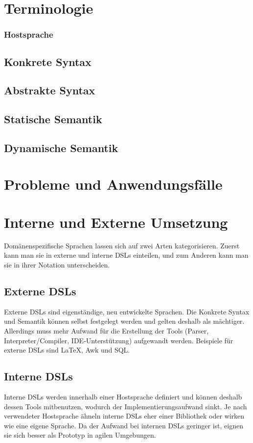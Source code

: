 \documentclass[../InterneDSLs.tex]{subfiles}
\begin{document}
\section{Terminologie}

\subsubsection{Hostsprache}
\subsection{Konkrete Syntax}
\subsection{Abstrakte Syntax}
\subsection{Statische Semantik}
\subsection{Dynamische Semantik}

\section{Probleme und Anwendungsfälle}


\section{Interne und Externe Umsetzung}
Domänenspezifische Sprachen lassen sich auf zwei Arten kategorisieren. Zuerst kann man sie in externe und interne DSLs einteilen, und zum Anderen kann man sie in ihrer Notation unterscheiden.

\subsection{Externe DSLs}
Externe DSLs sind eigenständige, neu entwickelte Sprachen. Die \gls{Konkrete Syntax} und Semantik können selbst festgelegt werden und gelten deshalb als mächtiger. Allerdings muss mehr Aufwand für die Erstellung der Tools (Parser, Interpreter/Compiler, \acs{IDE}-Unterstützung) aufgewandt werden. Beispiele für externe DSLs sind LaTeX, Awk und SQL.

\subsection{Interne DSLs}
Interne DSLs werden innerhalb einer Hostsprache definiert und können deshalb dessen Tools mitbenutzen, wodurch der Implementierungsaufwand sinkt. Je nach verwendeter Hostsprache ähneln interne DSLs eher einer Bibliothek oder wirken wie eine eigene Sprache. Da der Aufwand bei internen DSLs geringer ist, eignen sie sich besser als Prototyp in agilen Umgebungen.~\cite{butting2018deriving}
\end{document}
